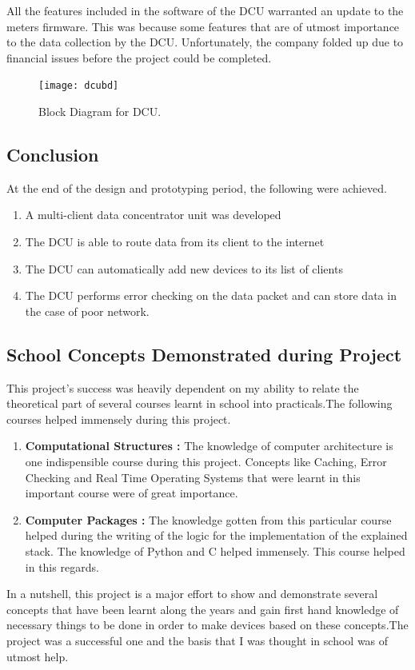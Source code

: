 All the features included in the software of the DCU warranted an update to the meters firmware. This was because some features that are of utmost importance to the data collection by the DCU. Unfortunately, the company folded up due to financial issues before the project could be completed.

\begin{figure}[p]
\texttt{[image: dcubd]}
\centering
\caption{Block Diagram for DCU.}
\centering
\label{fig:dcu_bd}

\end{figure}

\subsection{Conclusion}
At the end of the design and prototyping period, the following were achieved.
\begin{enumerate}
\item A multi-client data concentrator unit was developed
\item The DCU is able to route data from its client to the internet
\item The DCU can automatically add new devices to its list of clients
\item The DCU performs error checking on the data packet and can store data in the case of poor network.
\end{enumerate}

\subsection{School Concepts Demonstrated during Project}
This project's success was heavily dependent on my ability to relate the theoretical part of several courses learnt in school into practicals.The following courses helped immensely during this project.
\begin{enumerate}
\item \textbf{Computational Structures :} The knowledge of computer architecture is one indispensible course during this project. Concepts like Caching, Error Checking and Real Time Operating Systems that were learnt in this important course were of great importance.
\item \textbf{Computer Packages :} The knowledge gotten from this particular course helped during the writing of the logic for the implementation of the explained stack. The knowledge of Python and C helped immensely. This course helped in this regards.
\end{enumerate}
In a nutshell, this project is a major effort to show and demonstrate several concepts that have been learnt along the years and gain first hand knowledge of necessary things to be done in order to make devices based on these concepts.The project was a successful one and the basis that I was thought in school was of utmost help.

